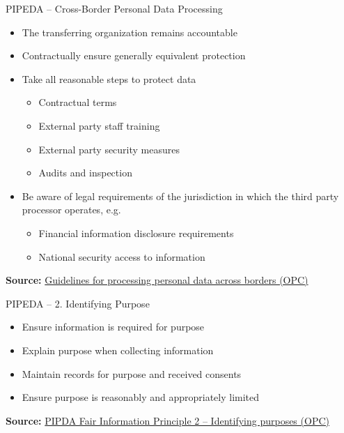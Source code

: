 \documentclass[ignorenonframetext,xcolor=x11names]{beamer}
\begin{document}
\begin{frame}[label=full]{PIPEDA -- Cross-Border Personal Data Processing}
\begin{itemize}
   \item The transferring organization remains accountable
   \item Contractually ensure generally equivalent protection
   \item Take all reasonable steps to protect data
   \begin{itemize}
      \item Contractual terms
      \item External party staff training
      \item External party security measures
      \item Audits and inspection
   \end{itemize}
   \item Be aware of legal requirements of the jurisdiction in which the third party processor operates, e.g. 
   \begin{itemize}
      \item Financial information disclosure requirements
      \item National security access to information
   \end{itemize}
\end{itemize}

\vspace{\baselineskip}
\scriptsize \textbf{Source:} \href{https://www.priv.gc.ca/en/privacy-topics/airports-and-borders/gl_dab_090127/}{Guidelines for processing personal data across borders (OPC)}
\end{frame}

\begin{frame}[label=full]{PIPEDA -- 2. Identifying Purpose}
\begin{itemize}
   \item Ensure information is required for purpose
   \item Explain purpose when collecting information
   \item Maintain records for purpose and received consents
   \item Ensure purpose is reasonably and appropriately limited
\end{itemize}

\vspace{\baselineskip}
\scriptsize \textbf{Source:} \href{https://www.priv.gc.ca/en/privacy-topics/privacy-laws-in-canada/the-personal-information-protection-and-electronic-documents-act-pipeda/p_principle/principles/p_purposes/}{PIPDA Fair Information Principle 2 -- Identifying purposes (OPC)}
\end{frame}
\end{document}
